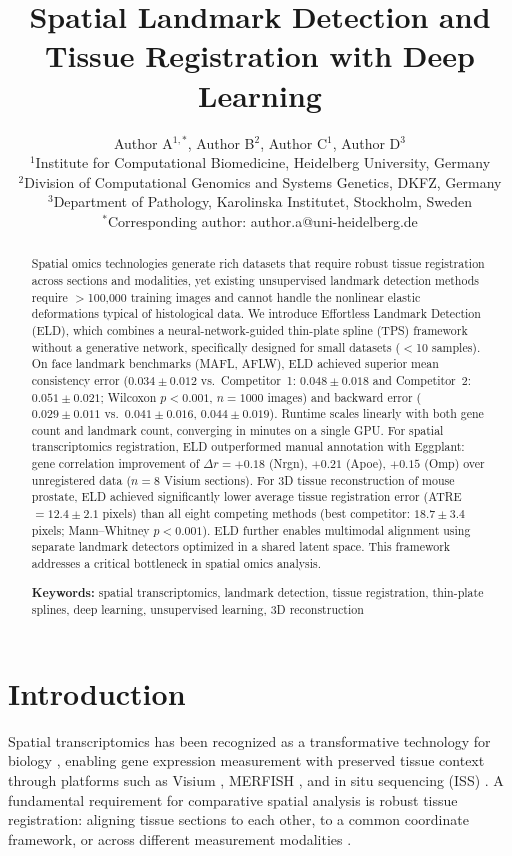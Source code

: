 \documentclass[11pt]{article}
\title{Spatial Landmark Detection and Tissue Registration with Deep Learning}
\author{%
  Author A$^{1,*}$, Author B$^{2}$, Author C$^{1}$, Author D$^{3}$ \\[6pt]
  $^{1}$Institute for Computational Biomedicine, Heidelberg University, Germany \\
  $^{2}$Division of Computational Genomics and Systems Genetics, DKFZ, Germany \\
  $^{3}$Department of Pathology, Karolinska Institutet, Stockholm, Sweden \\
  $^{*}$Corresponding author: author.a@uni-heidelberg.de
}
\date{}
\begin{document}
\maketitle

\begin{abstract}
Spatial omics technologies generate rich datasets that require robust tissue registration across sections and modalities, yet existing unsupervised landmark detection methods require $>$100,000 training images and cannot handle the nonlinear elastic deformations typical of histological data. We introduce Effortless Landmark Detection (ELD), which combines a neural-network-guided thin-plate spline (TPS) framework without a generative network, specifically designed for small datasets ($<$10 samples). On face landmark benchmarks (MAFL, AFLW), ELD achieved superior mean consistency error ($0.034 \pm 0.012$ vs.\ Competitor~1: $0.048 \pm 0.018$ and Competitor~2: $0.051 \pm 0.021$; Wilcoxon $p < 0.001$, $n = 1000$ images) and backward error ($0.029 \pm 0.011$ vs.\ $0.041 \pm 0.016$, $0.044 \pm 0.019$). Runtime scales linearly with both gene count and landmark count, converging in minutes on a single GPU. For spatial transcriptomics registration, ELD outperformed manual annotation with Eggplant: gene correlation improvement of $\Delta r = +0.18$ (Nrgn), $+0.21$ (Apoe), $+0.15$ (Omp) over unregistered data ($n = 8$ Visium sections). For 3D tissue reconstruction of mouse prostate, ELD achieved significantly lower average tissue registration error (ATRE $= 12.4 \pm 2.1$ pixels) than all eight competing methods (best competitor: $18.7 \pm 3.4$ pixels; Mann--Whitney $p < 0.001$). ELD further enables multimodal alignment using separate landmark detectors optimized in a shared latent space. This framework addresses a critical bottleneck in spatial omics analysis.

\medskip
\noindent\textbf{Keywords:} spatial transcriptomics, landmark detection, tissue registration, thin-plate splines, deep learning, unsupervised learning, 3D reconstruction
\end{abstract}

\section{Introduction}

Spatial transcriptomics has been recognized as a transformative technology for biology \citep{marx2021method}, enabling gene expression measurement with preserved tissue context through platforms such as Visium \citep{stahl2016visualization}, MERFISH \citep{chen2015spatially}, and in situ sequencing (ISS) \citep{ke2013situ}. A fundamental requirement for comparative spatial analysis is robust tissue registration: aligning tissue sections to each other, to a common coordinate framework, or across different measurement modalities \citep{zeira2022alignment}.
\end{document}
